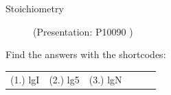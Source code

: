 \begin{exercises}{  Stoichiometry
      }
\begin{figure}[H]
             { (Presentation:  P10090 )}
      \vspace{2pt}
    \vspace{.1in}
 \end{figure}       \par \label{m38712*cid10}
\par {} Find the answers with the shortcodes:
 \par \begin{tabular}[h]{cccccc}
 (1.) lgI  &  (2.) lg5  &  (3.) lgN  & \end{tabular}
\end{exercises}
